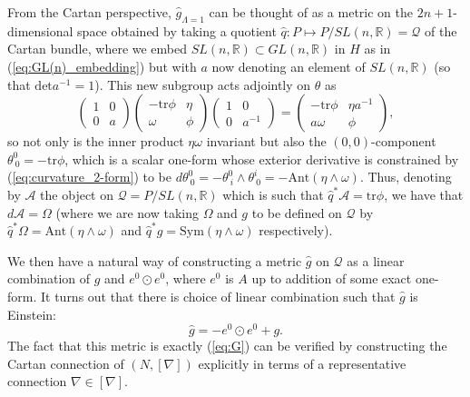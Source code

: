 From the Cartan perspective, $\hat{g}_{\Lambda=1}$ can be thought
of as a metric on the $2n+1$-dimensional space obtained by taking
a quotient $\hat{q}:P\mapsto P/SL(n,\mathbb{R})=\mathcal{Q}$ of the Cartan
bundle, where we embed $SL(n,\mathbb{R})\subset GL(n,\mathbb{R})$
in $H$ as in (\ref{eq:GL(n)_embedding}) but with $a$ now denoting
an element of $SL(n,\mathbb{R})$ (so that $\mathrm{det}a^{-1}=1$).
This new subgroup acts adjointly on $\theta$ as
\[
\begin{pmatrix}1 & 0\\
0 & a
\end{pmatrix}\begin{pmatrix}-\mathrm{tr}\phi & \eta\\
\omega & \phi
\end{pmatrix}\begin{pmatrix}1 & 0\\
0 & a^{-1}
\end{pmatrix}=\begin{pmatrix}-\mathrm{tr}\phi & \eta a^{-1}\\
a\omega & \phi
\end{pmatrix},
\]
so not only is the inner product $\eta\omega$ invariant but also
the $(0,0)$-component $\theta_{\ 0}^{0}=\mathrm{-tr}\phi$, which
is a scalar one-form whose exterior derivative is constrained by (\ref{eq:curvature_2-form}) to be $ d\theta_{\ 0}^{0}=-\theta_{\ i}^{0}\wedge\theta_{\ 0}^{i}=-\mathrm{Ant}(\eta\wedge\omega)$.
Thus, denoting by $\mathcal{A}$ the object on $\mathcal{Q}=P/SL(n,\mathbb{R})$
which is such that $\hat{q}^{*}\mathcal{A}=\mathrm{tr}\phi$, we have that
$ d\mathcal{A}=\Omega$ (where we are now taking $\Omega$ and $g$
to be defined on $\mathcal{Q}$ by $\hat{q}^{*}\Omega=\mathrm{Ant}(\eta\wedge\omega)$
and $\hat{q}^{*}g=\mathrm{Sym}(\eta\wedge\omega)$ respectively).

We then have a natural way of constructing a metric $\hat{g}$
on $\mathcal{Q}$ as a linear combination of $g$ and $e^{0}\odot e^{0}$,
where $e^{0}$ is $A$ up to addition of some exact one-form. It turns
out that there is choice of linear combination such that $\hat{g}$
is Einstein:
\[
\hat{g}=-e^{0}\odot e^{0}+g.
\]
The fact that this metric is exactly (\ref{eq:G}) can be verified
by constructing the Cartan connection of $(N,[\nabla])$ explicitly
in terms of a representative connection $\nabla\in[\nabla]$.

